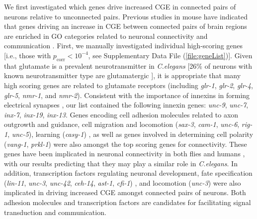 {We first investigated which genes drive increased CGE in connected pairs of neurons relative to unconnected pairs.
Previous studies in mouse have indicated that genes driving an increase in CGE between connected pairs of brain regions are enriched in GO categories related to neuronal connectivity and communication \citep{Fulcher2016, Ji2014, Fakhry2015a, French2011}.
First, we manually investigated individual high-scoring genes [i.e., those with $p_\mathrm{corr} < 10^{-4}$, see Supplementary Data File (\ref{file:geneList})].
Given that glutamate is a prevalent neurotransmitter in \textit{C.elegans} [26\% of neurons with known neurotransmitter type are glutamatergic \citep{Pereira2015}], it is appropriate that many high scoring genes are related to glutamate receptors (including \emph{glr-1}, \emph{glr-2}, \emph{glr-4}, \emph{glr-5}, \emph{nmr-1}, and \emph{nmr-2}).
Consistent with the importance of innexins in forming electrical synapses \citep{Starich2001}, our list contained the following innexin genes: \emph{unc-9}, \emph{unc-7}, \emph{inx-7}, \emph{inx-19}, \emph{inx-13}.
Genes encoding cell adhesion molecules related to axon outgrowth and guidance, cell migration and locomotion (\emph{sax-3}, \emph{cam-1}, \emph{unc-6}, \emph{rig-1}, \emph{unc-5}), learning (\emph{casy-1}) \citep{Zallen1999, Garriga1999, Leung-Hagesteijn1992, Harris2010, Ikeda2008},
as well as genes involved in determining cell polarity (\emph{vang-1}, \emph{prkl-1}) \citep{Wu2006, Hoffmann2010} were also amongst the top scoring genes for connectivity.
These genes have been implicated in neuronal connectivity in both flies and humans \citep{Paemka2013, Ehaideb2016, Sowers2013}, with our results predicting that they may play a similar role in \textit{C.elegans}.
In addition, transcription factors regulating neuronal development,
fate specification (\emph{lin-11}, \emph{unc-3}, \emph{unc-42}, \emph{ceh-14}, \emph{ast-1}, \emph{cfi-1}) \citep{Sarafi-Reinach2001, Prasad2008, Baran1999, Cassata2000, Schmid2006, Shaham2002a},
and locomotion (\emph{unc-3}) \citep{Prasad2008} were also implicated in driving increased CGE amongst connected pairs of neurons.
Both adhesion molecules and transcription factors are candidates for facilitating signal transduction and communication.

}

